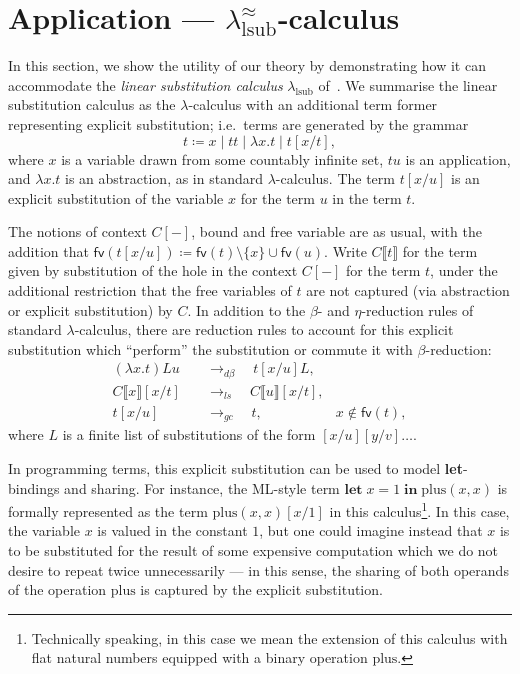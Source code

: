 \section{Application --- $\lambda^\approx_{\text{lsub}}$-calculus}
\label{sec:application}

In this section, we show the utility of our theory by demonstrating how it can accommodate the \emph{linear substitution calculus} $\lambda_{\text{lsub}}$ of~\citet[§ 2]{accattoli2014nonstandard}.
We summarise the linear substitution calculus as the $\lambda$-calculus with an additional term former representing explicit substitution; i.e.\ terms are generated by the grammar
\[
	t \coloneqq x \mid t t \mid \lambda x. t \mid t [x/t],
\]
where $x$ is a variable drawn from some countably infinite set, $t u$ is an application, and $\lambda x. t$ is an abstraction, as in standard $\lambda$-calculus.
The term $t [x / u]$ is an explicit substitution of the variable $x$ for the term $u$ in the term $t$.

The notions of context $C[-]$, bound and free variable are as usual, with the addition that $\textsf{fv} (t [x/u]) \coloneq \textsf{fv} (t) \setminus \{ x \} \cup \textsf{fv} (u)$.
Write $C \llbracket t \rrbracket$ for the term given by substitution of the hole in the context $C[-]$ for the term $t$, under the additional restriction that the free variables of $t$ are not captured (via abstraction or explicit substitution) by $C$.
In addition to the $\beta$- and $\eta$-reduction rules of standard $\lambda$-calculus, there are reduction rules to account for this explicit substitution which \enquote{perform} the substitution or commute it with $\beta$-reduction:
\begin{align*}
	(\lambda x. t) L u              \quad & \to_{d\beta} \quad t[x/u] L,                                                \\
	C \llbracket x \rrbracket [x/t] \quad & \to_{ls} \quad C \llbracket u \rrbracket [x/t],                             \\
	t [x/u]                         \quad & \to_{gc} \quad t,                               & x \notin \textsf{fv} (t),
\end{align*}
where $L$ is a finite list of substitutions of the form $[x/u] [y/v] \ldots$.

In programming terms, this explicit substitution can be used to model \textbf{let}-bindings and sharing.
For instance, the ML-style term $\textbf{let} \; x = 1 \; \textbf{in} \; \text{plus} (x, x)$ is formally represented as the term $\text{plus} (x, x) [x / 1]$ in this calculus\footnote{Technically speaking, in this case we mean the extension of this calculus with flat natural numbers equipped with a binary operation $\text{plus}$.}.
In this case, the variable $x$ is valued in the constant $1$, but one could imagine instead that $x$ is to be substituted for the result of some expensive computation which we do not desire to repeat twice unnecessarily --- in this sense, the sharing of both operands of the operation $\text{plus}$ is captured by the explicit substitution.


